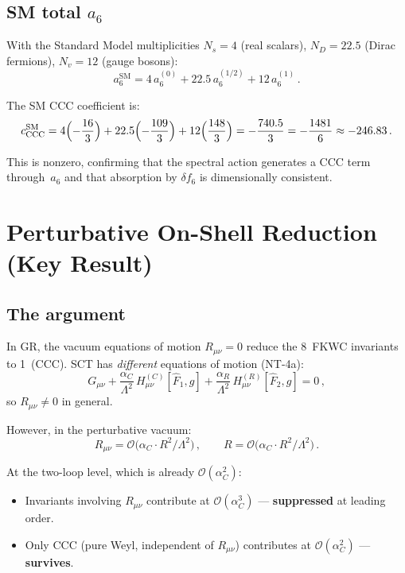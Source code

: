 \documentclass[11pt,a4paper]{article}
\newcommand{\order}{\mathcal{O}}
\begin{document}
\subsection{SM total $a_6$}

With the Standard Model multiplicities $N_s=4$ (real scalars),
$N_D=22.5$ (Dirac fermions), $N_v=12$ (gauge bosons):
\begin{equation}
  a_6^{\mathrm{SM}} = 4\,a_6^{(0)} + 22.5\,a_6^{(1/2)} + 12\,a_6^{(1)}\,.
\end{equation}

The SM CCC coefficient is:
\begin{equation}\label{eq:sm-ccc}
  c_{\mathrm{CCC}}^{\mathrm{SM}}
  = 4\Bigl(-\frac{16}{3}\Bigr)
  + 22.5\Bigl(-\frac{109}{3}\Bigr)
  + 12\Bigl(\frac{148}{3}\Bigr)
  = -\frac{740.5}{3}
  = -\frac{1481}{6}
  \approx -246.83\,.
\end{equation}

This is nonzero, confirming that the spectral action generates a CCC term
through~$a_6$ and that absorption by $\delta f_6$ is dimensionally consistent.


\section{Perturbative On-Shell Reduction (Key Result)}
\label{sec:reduction}

\subsection{The argument}

In GR, the vacuum equations of motion $R_{\mu\nu}=0$ reduce the 8~FKWC
invariants to 1~(CCC).  SCT has \emph{different} equations of motion
(NT-4a):
\begin{equation}
  G_{\mu\nu}
  + \frac{\alpha_C}{\Lambda^2}\,H_{\mu\nu}^{(C)}[\hat{F}_1,g]
  + \frac{\alpha_R}{\Lambda^2}\,H_{\mu\nu}^{(R)}[\hat{F}_2,g]
  = 0\,,
\end{equation}
so $R_{\mu\nu}\neq 0$ in general.

However, in the perturbative vacuum:
\begin{equation}\label{eq:rab-order}
  R_{\mu\nu} = \order\!\bigl(\alpha_C\cdot R^2/\Lambda^2\bigr)\,,
  \qquad
  R = \order\!\bigl(\alpha_C\cdot R^2/\Lambda^2\bigr)\,.
\end{equation}

At the two-loop level, which is already $\order(\alpha_C^2)$:
\begin{itemize}
  \item Invariants involving $R_{\mu\nu}$ contribute at
    $\order(\alpha_C^3)$ --- \textbf{suppressed} at leading order.
  \item Only CCC (pure Weyl, independent of $R_{\mu\nu}$)
    contributes at $\order(\alpha_C^2)$ --- \textbf{survives}.
\end{itemize}
\end{document}
